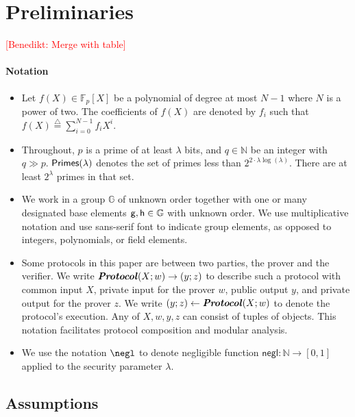\documentclass{article}
\theoremstyle{definition}
\newcommand{\benedikt}[1]{{\textcolor{red}{[Benedikt: #1]}}}
\newcommand{\ben}[1]{{\textcolor{green}{[Ben: #1]}}}
\newcommand{\benedikt}[1]{}
\newcommand{\ben}[1]{}
\begin{document}
\section{Preliminaries}
\benedikt{Merge with table}
\paragraph{Notation}
\begin{itemize}
\item Let $f(X) \in \mathbb{F}_p[X]$ be a polynomial of degree at most $N-1$ where $N$ is a power of two. The coefficients of $f(X)$ are denoted by $f_i$ such that $f(X) \stackrel{\triangle}{=} \sum_{i=0}^{N-1} f_i X^i$.
\item Throughout, $p$ is a prime of at least $\lambda$ bits, and $q \in \mathbb{N}$ be an integer with $q \gg p$.  $\textsf{Primes}(\lambda)$ denotes the set of primes less than $2^{2\cdot \lambda \log(\lambda)}$. There are at least $2^\lambda$ primes in that set.
\item We work in a group $\mathbb{G}$ of unknown order together with one or many designated base elements $\mathsf{g}, \mathsf{h} \in \mathbb{G}$ with unknown order. 
We use multiplicative notation and use \textsf{sans-serif} font to indicate group elements, as opposed to integers, polynomials, or field elements.
\item Some protocols in this paper are between two parties, the prover and the verifier. We write $\boldsymbol{\it Protocol}(X;w) \rightarrow (y;z)$ to describe such a protocol with common input $X$, private input for the prover $w$, public output $y$, and private output for the prover $z$. We write $(y;z) \gets \boldsymbol{\it Protocol}(X;w)$ to denote the protocol's execution. Any of $X,w,y,z$ can consist of tuples of objects. This notation facilitates protocol composition and modular analysis.

\item We use the notation $\negl$ to denote negligible function $\textsf{negl}: \mathbb{N} \rightarrow [0,1]$ applied to the security parameter $\lambda$. 

\end{itemize}

\subsection{Assumptions}
\end{document}

